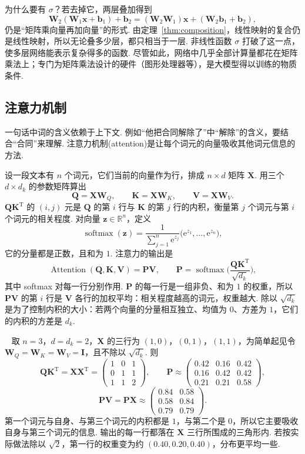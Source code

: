 \documentclass[lang=cn,10.5pt,scheme=chinese,toc=twocol,section,chinesefont=nofont,
twoside,citestyle=gb7714-2015,bibstyle=gb7714-2015]{elegantbook}
\DeclareRobustCommand{\textbf}[1]{{\lnsemiboldlatin\lnsemiboldcjk #1}}
\newcommand{\vv}[1]{\boldsymbol{#1}}
\newcommand{\trans}{\mathrm{T}}             %
\numberwithin{equation}{section}   %
\newcommand*{\lnlabel}[1]{{\sffamily\bfseries\color{black}#1}}
\renewenvironment{example}[1][]{%
	\refstepcounter{exam}%
	\par\noindent\lnlabel{\examplename\ \theexam\ifblank{#1}{}{\ #1}}\ \rmfamily}{%
	\par\ignorespacesafterend}
\begin{document}
为什么要有 $\sigma$？若去掉它，两层叠加得到
\[
  \vv W_2(\vv W_1\vv x+\vv b_1)+\vv b_2=(\vv W_2\vv W_1)\vv x+(\vv W_2\vv b_1+\vv b_2),
\]
仍是“矩阵乘向量再加向量”的形式. 由定理~\ref{thm:composition}，线性映射的复合仍是线性映射，所以无论叠多少层，都只相当于一层. 非线性函数 $\sigma$ 打破了这一点，使多层网络能表示复杂得多的函数. 尽管如此，网络中几乎全部计算量都花在矩阵乘法上；专门为矩阵乘法设计的硬件（图形处理器等），是大模型得以训练的物质条件.

\subsection{注意力机制}

一句话中词的含义依赖于上下文. 例如“他把合同解除了”中“解除”的含义，要结合“合同”来理解. \textbf{注意力机制}(attention)是让每个词元的向量吸收其他词元信息的方法.

设一段文本有 $n$ 个词元，它们当前的向量作为行，排成 $n\times d$ 矩阵 $\vv X$. 用三个 $d\times d_k$ 的参数矩阵算出
\[
  \vv Q=\vv X\vv W_Q,\qquad \vv K=\vv X\vv W_K,\qquad \vv V=\vv X\vv W_V.
\]
$\vv Q\vv K^\trans$ 的 $(i,j)$ 元是 $\vv Q$ 的第 $i$ 行与 $\vv K$ 的第 $j$ 行的内积，衡量第 $j$ 个词元与第 $i$ 个词元的相关程度. 对向量 $\vv z\in\mathbb{R}^n$，定义
\[
  \operatorname{softmax}(\vv z)=\frac{1}{\sum_{j=1}^n\mathrm e^{z_j}}\big(\mathrm e^{z_1},\ldots,\mathrm e^{z_n}\big),
\]
它的分量都是正数，且和为 $1$. 注意力的输出是
\[
  \operatorname{Attention}(\vv Q,\vv K,\vv V)=\vv P\vv V,\qquad \vv P=\operatorname{softmax}\Big(\frac{\vv Q\vv K^\trans}{\sqrt{d_k}}\Big),
\]
其中 softmax 对每一行分别作用. $\vv P$ 的每一行是一组非负、和为 $1$ 的权重，所以 $\vv P\vv V$ 的第 $i$ 行是 $\vv V$ 各行的\textbf{加权平均}：相关程度越高的词元，权重越大. 除以 $\sqrt{d_k}$ 是为了控制内积的大小：若两个向量的分量相互独立、均值为 $0$、方差为 $1$，它们的内积的方差是 $d_k$.

\begin{example}
  取 $n=3$，$d=d_k=2$，$\vv X$ 的三行为 $(1,0)$，$(0,1)$，$(1,1)$，为简单起见令 $\vv W_Q=\vv W_K=\vv W_V=\vv I$，且不除以 $\sqrt{d_k}$. 则
  \[
    \vv Q\vv K^\trans=\vv X\vv X^\trans=
    \begin{pmatrix}
      1 & 0 & 1 \\0&1&1\\1&1&2
    \end{pmatrix}
    ,
    \qquad
    \vv P\approx
    \begin{pmatrix}
      0.42 & 0.16 & 0.42 \\0.16&0.42&0.42\\0.21&0.21&0.58
    \end{pmatrix}
    ,
  \]
  \[
    \vv P\vv V=\vv P\vv X\approx
    \begin{pmatrix}
      0.84 & 0.58 \\0.58&0.84\\0.79&0.79
    \end{pmatrix}
    .
  \]
  第一个词元与自身、与第三个词元的内积都是 $1$，与第二个是 $0$，所以它主要吸收自身与第三个词元的信息. 输出的每一行都落在 $\vv X$ 三行所围成的三角形内. 若按实际做法除以 $\sqrt2$，第一行的权重变为约 $(0.40,0.20,0.40)$，分布更平均一些.
\end{example}
\end{document}
